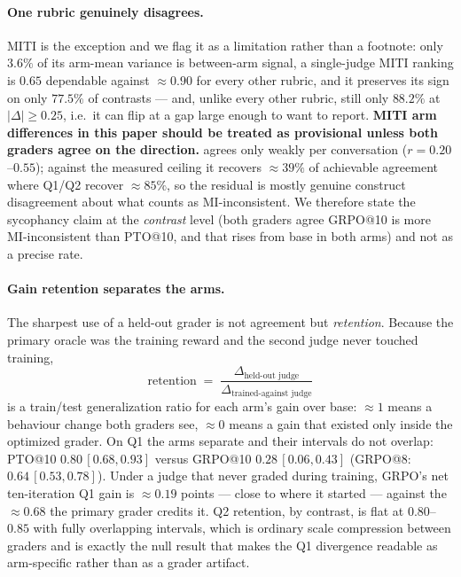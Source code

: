 \paragraph{One rubric genuinely disagrees.}
MITI is the exception and we flag it as a limitation rather than a footnote: only $3.6\%$
of its arm-mean variance is between-arm signal, a single-judge MITI ranking is $0.65$
dependable against ${\approx}0.90$ for every other rubric, and it preserves its sign on only
$77.5\%$ of contrasts --- and, unlike every other rubric, still only $88.2\%$ at
$|\Delta|\!\ge\!0.25$, i.e.\ it can flip at a gap large enough to want to report.
\textbf{MITI arm differences in this paper should be treated as provisional unless both
graders agree on the direction.} \mici{} agrees only weakly per conversation
($r=0.20$--$0.55$); against the measured ceiling it recovers ${\approx}39\%$ of achievable
agreement where Q1/Q2 recover ${\approx}85\%$, so the residual is mostly genuine construct
disagreement about what counts as MI-inconsistent. We therefore state the sycophancy claim
at the \emph{contrast} level (both graders agree GRPO@10 is more MI-inconsistent than
PTO@10, and that \mici{} rises from base in both arms) and not as a precise rate.

\paragraph{Gain retention separates the arms.}
The sharpest use of a held-out grader is not agreement but \emph{retention}. Because the
primary oracle was the training reward and the second judge never touched training,
\[
  \text{retention} \;=\;
  \frac{\Delta_{\text{held-out judge}}}{\Delta_{\text{trained-against judge}}}
\]
is a train/test generalization ratio for each arm's gain over base: ${\approx}1$ means a
behaviour change both graders see, ${\approx}0$ means a gain that existed only inside the
optimized grader. On Q1 the arms separate and their intervals do not overlap:
PTO@10 $0.80\,[0.68, 0.93]$ versus GRPO@10 $0.28\,[0.06, 0.43]$ (GRPO@8:
$0.64\,[0.53, 0.78]$). Under a judge that never graded during training, GRPO's net
ten-iteration Q1 gain is ${\approx}0.19$ points --- close to where it started --- against
the ${\approx}0.68$ the primary grader credits it. Q2 retention, by contrast, is flat at
$0.80$--$0.85$ with fully overlapping intervals, which is ordinary scale compression
between graders and is exactly the null result that makes the Q1 divergence readable as
arm-specific rather than as a grader artifact.

